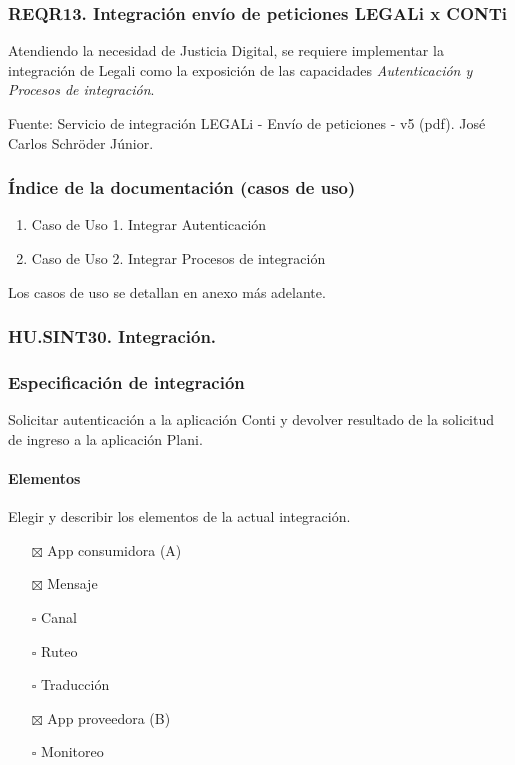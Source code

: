 \documentclass[
  paper=a4,
  ,captions=tableheading
]{scrartcl}
\providecommand{\tightlist}{%
  \setlength{\itemsep}{0pt}\setlength{\parskip}{0pt}}
\begin{document}
\subsubsection{REQR13. Integración envío de peticiones LEGALi x
CONTi}\label{sec:reqr13.-integraciuxf3n-envuxedo-de-peticiones-legali-x-conti-1}

Atendiendo la necesidad de Justicia Digital, se requiere implementar la
integración de Legali como la exposición de las capacidades
\emph{Autenticación y Procesos de integración}.

Fuente: Servicio de integración LEGALi - Envío de peticiones - v5 (pdf).
José Carlos Schröder Júnior.

\subsubsection{Índice de la documentación (casos de
uso)}\label{sec:uxedndice-de-la-documentaciuxf3n-casos-de-uso-3}

\begin{enumerate}
\def\labelenumi{\arabic{enumi}.}
\tightlist
\item
  Caso de Uso 1. Integrar Autenticación
\item
  Caso de Uso 2. Integrar Procesos de integración
\end{enumerate}

Los casos de uso se detallan en anexo más adelante.

\subsubsection{HU.SINT30.
Integración.}\label{sec:hu.sint30.-integraciuxf3n.}

\subsubsection{Especificación de
integración}\label{sec:especificaciuxf3n-de-integraciuxf3n-2}

Solicitar autenticación a la aplicación Conti y devolver resultado de la
solicitud de ingreso a la aplicación Plani.

\paragraph{Elementos}\label{sec:elementos-2}

Elegir y describir los elementos de la actual integración.

\begin{itemize}
\tightlist
\item[$\boxtimes$]
  App consumidora (A)
\item[$\boxtimes$]
  Mensaje
\item[$\square$]
  Canal
\item[$\square$]
  Ruteo
\item[$\square$]
  Traducción
\item[$\boxtimes$]
  App proveedora (B)
\item[$\square$]
  Monitoreo
\end{itemize}
\end{document}
